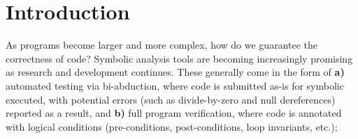 
\chapter{Introduction}\label{sec:intro}

As programs become larger and more complex, how do we guarantee the correctness
of code? Symbolic analysis tools are becoming increasingly promising as research
and development continues. These generally come in the form of {\bf a)}
automated testing via bi-abduction, where code is submitted as-is for symbolic
executed, with potential errors (such as divide-by-zero and null dereferences)
reported as a result, and {\bf b)} full program verification, where code is
annotated with logical conditions (pre-conditions, post-conditions, loop
invariants, etc.); 







